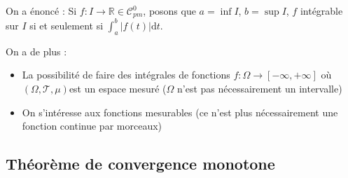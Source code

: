 On a énoncé : Si $f : I \to \mathbb{R} \in \mathcal{C}_{pm} ^{0}$, posons que $a = \inf I$, $b = \sup I$, $f$ intégrable sur $I$ si et seulement si $\int_{a}^{b} |f(t) | \mathrm{d}t$.

On a de plus : 
\begin{itemize}

  \item La possibilité  de faire des intégrales de fonctions $f : \Omega \to [- \infty, + \infty]$ où $(\Omega, \mathcal{T}, \mu)$est un espace mesuré ($\Omega$ n'est pas nécessairement un intervalle)

  \item On s'intéresse aux fonctions mesurables (ce n'est plus nécessairement une fonction continue par morceaux)

\end{itemize}

\subsection{Théorème de convergence monotone} %
\label{sub:Théorème de convergence monotone}


